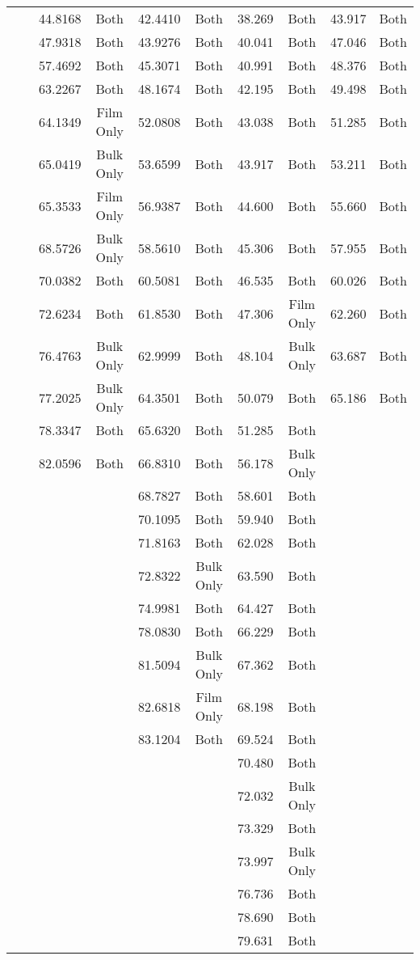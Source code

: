 \documentclass[draft,a4paper,12pt,oneside]{article}%
\begin{document}
\begin{table}[b]
\begin{tabular}{cccccccccc}
		&  & 44.8168 & Both & 42.4410 & Both & 38.269 & Both & 43.917 & Both \\
		&  & 47.9318 & Both & 43.9276 & Both & 40.041 & Both & 47.046 & Both \\
		&  & 57.4692 & Both & 45.3071 & Both & 40.991 & Both & 48.376 & Both \\
		&  & 63.2267 & Both & 48.1674 & Both & 42.195 & Both & 49.498 & Both \\
		&  & 64.1349 & Film Only & 52.0808 & Both & 43.038 & Both & 51.285 & Both \\
		&  & 65.0419 & Bulk Only & 53.6599 & Both & 43.917 & Both & 53.211 & Both \\
		&  & 65.3533 & Film Only & 56.9387 & Both & 44.600 & Both & 55.660 & Both \\
		&  & 68.5726 & Bulk Only & 58.5610 & Both & 45.306 & Both & 57.955 & Both \\
		&  & 70.0382 & Both & 60.5081 & Both & 46.535 & Both & 60.026 & Both \\
		&  & 72.6234 & Both & 61.8530 & Both & 47.306 & Film Only & 62.260 & Both \\
		&  & 76.4763 & Bulk Only & 62.9999 & Both & 48.104 & Bulk Only & 63.687 & Both \\
		&  & 77.2025 & Bulk Only & 64.3501 & Both & 50.079 & Both & 65.186 & Both \\
		&  & 78.3347 & Both & 65.6320 & Both & 51.285 & Both &  &  \\
		&  & 82.0596 & Both & 66.8310 & Both & 56.178 & Bulk Only &  &  \\
		&  &  &  & 68.7827 & Both & 58.601 & Both &  &  \\
		&  &  &  & 70.1095 & Both & 59.940 & Both &  &  \\
		&  &  &  & 71.8163 & Both & 62.028 & Both &  &  \\
		&  &  &  & 72.8322 & Bulk Only & 63.590 & Both &  &  \\
		&  &  &  & 74.9981 & Both & 64.427 & Both &  &  \\
		&  &  &  & 78.0830 & Both & 66.229 & Both &  &  \\
		&  &  &  & 81.5094 & Bulk Only & 67.362 & Both &  &  \\
		&  &  &  & 82.6818 & Film Only & 68.198 & Both &  &  \\
		&  &  &  & 83.1204 & Both & 69.524 & Both &  &  \\
		&  &  &  &  &  & 70.480 & Both &  &  \\
		&  &  &  &  &  & 72.032 & Bulk Only &  &  \\
		&  &  &  &  &  & 73.329 & Both &  &  \\
		&  &  &  &  &  & 73.997 & Bulk Only &  &  \\
		&  &  &  &  &  & 76.736 & Both &  &  \\
		&  &  &  &  &  & 78.690 & Both &  &  \\
		&  &  &  &  &  & 79.631 & Both &  & \\
	\end{tabular}
	\label{tab:Sub_Annealing_XRD_Peaks}
\end{table}
\end{document}
